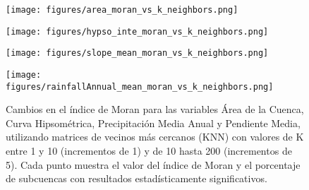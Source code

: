 \documentclass[
  manuscript=article,  
  layout=preprint,  
  year=2023,
  volume=0,
]{format}
\begin{document}
\begin{figure}[ht!]
    \centering
    \begin{minipage}{0.48\textwidth}
        \centering
        \texttt{[image: figures/area\_moran\_vs\_k\_neighbors.png]}
    \end{minipage}%
    \hfill
    \begin{minipage}{0.48\textwidth}
        \centering
        \texttt{[image: figures/hypso\_inte\_moran\_vs\_k\_neighbors.png]}
    \end{minipage}
    
    \vspace{0.5cm} %
    
    \begin{minipage}{0.48\textwidth}
        \centering
        \texttt{[image: figures/slope\_mean\_moran\_vs\_k\_neighbors.png]}
    \end{minipage}%
    \hfill
    \begin{minipage}{0.48\textwidth}
        \centering
        \texttt{[image: figures/rainfallAnnual\_mean\_moran\_vs\_k\_neighbors.png]}
        \label{fig:moran_distancia}
    \end{minipage}
            \caption{Cambios en el índice de Moran para las variables Área de la Cuenca, Curva Hipsométrica, Precipitación Media Anual y Pendiente Media, utilizando matrices de vecinos más cercanos (KNN) con valores de K entre 1 y 10 (incrementos de 1) y de 10 hasta 200 (incrementos de 5). Cada punto muestra el valor del índice de Moran y el porcentaje de subcuencas con resultados estadísticamente significativos.}
\end{figure}
\end{document}
